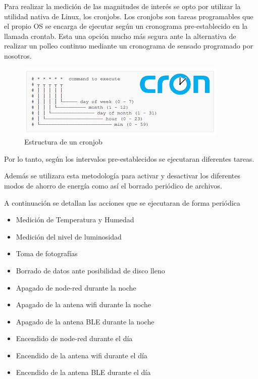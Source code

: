 Para realizar la medición de las magnitudes de interés se opto por utilizar la utilidad nativa de Linux, los cronjobs. Los cronjobs son tareas programables que el propio OS se encarga de ejecutar según un cronograma pre-establecido en la llamada crontab. Esta una opción mucho más segura ante la alternativa de realizar un polleo continuo mediante un cronograma de sensado programado por nosotros.
\begin{figure}[H]
	\centering
	\includegraphics[width=0.7\linewidth]{"../Ingenieria de Detalle/ImagenesIngenieria de Detalle/cron"}
	\caption{Estructura de un cronjob}
	\label{fig:cron}
\end{figure}

Por lo tanto, según los intervalos pre-establecidos se ejecutaran diferentes tareas.

Además se utilizara esta metodología para activar y desactivar los diferentes modos de ahorro de energía como así el borrado periódico de archivos.

A continuación se detallan las acciones que se ejecutaran de forma periódica  
\begin{itemize}
	\item Medición de Temperatura y Humedad
	\item Medición del nivel de luminosidad
	\item Toma de fotografías
	\item Borrado de datos ante posibilidad de disco lleno
	\item Apagado de node-red durante la noche
	\item Apagado de la antena wifi durante la noche
	\item Apagado de la antena BLE durante la noche
	\item Encendido de node-red durante el día
	\item Encendido de la antena wifi durante el día
	\item Encendido de la antena BLE durante el día
\end{itemize}










